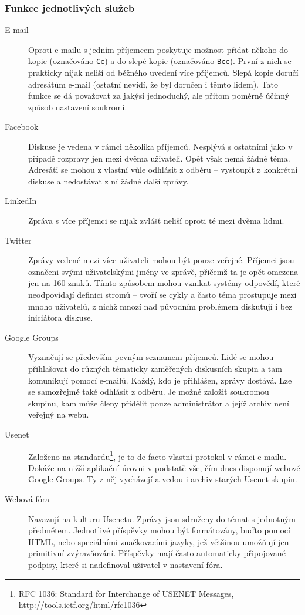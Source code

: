 \documentclass[12pt,oneside,final]{fithesis2}
\begin{document}
\subsubsection*{Funkce jednotlivých služeb}
\begin{description}
    \item[E-mail]
        Oproti e-mailu s jedním příjemcem poskytuje možnost přidat někoho do kopie (označováno {\tt Cc}) a do slepé kopie (označováno {\tt Bcc}). První z nich se prakticky nijak neliší od běžného uvedení více příjemců. Slepá kopie doručí adresátům e-mail  (ostatní nevidí, že byl doručen i těmto lidem). Tato funkce se dá považovat za jakýsi jednoduchý, ale přitom poměrně účinný způsob nastavení soukromí.

    \item[Facebook]
        Diskuse je vedena v rámci několika příjemců. Nesplývá s ostatními jako v případě rozpravy jen mezi dvěma uživateli. Opět však nemá žádné téma. Adresáti se mohou z vlastní vůle odhlásit z odběru -- vystoupit z konkrétní diskuse a nedostávat z ní žádné další zprávy.

    \item[LinkedIn]
        Zpráva s více příjemci se nijak zvlášť neliší oproti té mezi dvěma lidmi.

    \item[Twitter]
        Zprávy vedené mezi více uživateli mohou být pouze veřejné. Příjemci jsou označeni svými uživatelskými jmény ve zprávě, přičemž ta je opět omezena jen na 160 znaků. Tímto způsobem mohou vznikat systémy odpovědí, které neodpovídají definici stromů -- tvoří se cykly a často téma prostupuje mezi mnoho uživatelů, z nichž mnozí nad původním problémem diskutují i bez iniciátora diskuse.

    \item[Google Groups]
        Vyznačují se především pevným seznamem příjemců. Lidé se mohou přihlašovat do různých tématicky zaměřených diskusních skupin a tam komunikují pomocí e-mailů. Každý, kdo je přihlášen, zprávy dostává. Lze se samozřejmě také odhlásit z odběru. Je možné založit soukromou skupinu, kam může členy přidělit pouze administrátor a jejíž archiv není veřejný na webu.

    \item[Usenet]
        Založeno na standardu\footnote{RFC 1036: Standard for Interchange of USENET Messages, \url{http://tools.ietf.org/html/rfc1036}}, je to de facto vlastní protokol v rámci e-mailu. Dokáže na nižší aplikační úrovni v podstatě vše, čím dnes disponují webové Google Groups. Ty z něj vycházejí a vedou i archiv starých Usenet skupin.

    \item[Webová fóra]
        Navazují na kulturu Usenetu. Zprávy jsou sdruženy do témat s jednotným předmětem. Jednotlivé příspěvky mohou být formátovány, buďto pomocí HTML, nebo speciálními značkovacími jazyky, jež většinou umožňují jen primitivní zvýrazňování. Příspěvky mají často automaticky připojované podpisy, které si nadefinoval uživatel v nastavení fóra.
\end{description}
\end{document}
